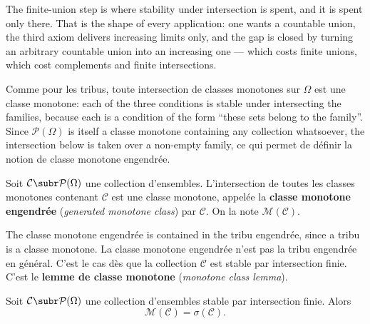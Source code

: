 \begin{remark}
  The finite-union step is where stability under intersection is spent, and it is
  spent only there. That is the shape of every application: one wants a countable
  union, the third axiom delivers increasing limits only, and the gap is closed by
  turning an arbitrary countable union into an increasing one --- which costs finite
  unions, which cost complements and finite intersections.
\end{remark}

Comme pour les tribus, toute intersection de classes monotones sur $\Omega$ est une
classe monotone: each of the three conditions is stable under intersecting the
families, because each is a condition of the form ``these sets belong to the
family''. Since $\mathcal{P}(\Omega)$ is itself a classe monotone containing any
collection whatsoever, the intersection below is taken over a non-empty family, ce
qui permet de définir la notion de classe monotone engendrée.

\begin{definition}
  Soit $\mathcal{C} \subr \mathcal{P}(\Omega)$ une collection d'ensembles.
  L'intersection de toutes les classes monotones contenant $\mathcal{C}$ est une
  classe monotone, appelée la \textbf{classe monotone engendrée}
  (\textit{generated monotone class}) par $\mathcal{C}$. On la note
  $\mathcal{M}(\mathcal{C})$.
\end{definition}

The classe monotone engendrée is contained in the tribu engendrée, since a tribu is
a classe monotone. La classe monotone engendrée n'est pas la tribu engendrée en
général. C'est le cas dès que la collection $\mathcal{C}$ est stable par
intersection finie. C'est le \textbf{lemme de classe monotone} (\textit{monotone
class lemma}).

\begin{lemma}
  Soit $\mathcal{C} \subr \mathcal{P}(\Omega)$ une collection d'ensembles stable par
  intersection finie. Alors
  \[
    \mathcal{M}(\mathcal{C}) = \sigma(\mathcal{C}).
  \]
\end{lemma}

